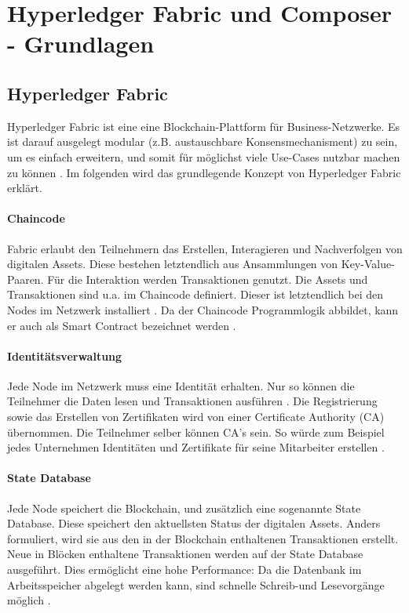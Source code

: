 \label{sec:hyperledger-fabric-composer}
\section{Hyperledger Fabric und Composer - Grundlagen}

\subsection{Hyperledger Fabric}
Hyperledger Fabric ist eine eine Blockchain-Plattform für Business-Netzwerke. Es ist darauf ausgelegt modular (z.B. austauschbare Konsensmechanisment) zu sein, um es einfach erweitern, und somit für möglichst viele Use-Cases nutzbar machen zu können \cite{HyperledgerFabricTeamHyperledgerWhitepaper2016}. Im folgenden wird das grundlegende Konzept von Hyperledger Fabric erklärt.

\paragraph{Chaincode}
Fabric erlaubt den Teilnehmern das Erstellen, Interagieren und Nachverfolgen von digitalen Assets. Diese bestehen letztendlich aus Ansammlungen von Key-Value-Paaren. Für die Interaktion werden Transaktionen genutzt. Die Assets und Transaktionen sind u.a. im Chaincode definiert. Dieser ist letztendlich bei den Nodes im Netzwerk installiert \cite{SchererPerformanceScalabilityBlockchain2017}. Da der Chaincode Programmlogik abbildet, kann er auch als Smart Contract bezeichnet werden \cite{ChaincodeHyperledgerFabric}.

\paragraph{Identitätsverwaltung}
Jede Node im Netzwerk muss eine Identität erhalten. Nur so können die Teilnehmer die Daten lesen und Transaktionen ausführen \cite{SchererPerformanceScalabilityBlockchain2017}. Die Registrierung sowie das Erstellen von Zertifikaten wird von einer Certificate Authority (CA) übernommen. Die Teilnehmer selber können CA's sein. So würde zum Beispiel jedes Unternehmen Identitäten und Zertifikate für seine Mitarbeiter erstellen \cite{HyperledgerFabricCA}.

\paragraph{State Database}
Jede Node speichert die Blockchain, und zusätzlich eine sogenannte State Database. Diese speichert den aktuellsten Status der digitalen Assets. Anders formuliert, wird sie aus den in der Blockchain enthaltenen Transaktionen erstellt. Neue in Blöcken enthaltene Transaktionen werden auf der State Database ausgeführt. Dies ermöglicht eine hohe Performance: Da die Datenbank im Arbeitsspeicher abgelegt werden kann, sind schnelle Schreib-und Lesevorgänge möglich \cite{SchererPerformanceScalabilityBlockchain2017}.

